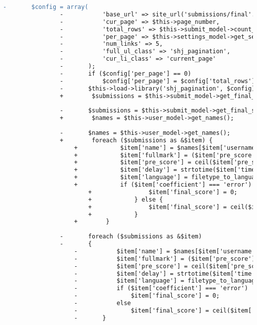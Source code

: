 \begin{lstlisting}[language=diff, caption=Perubahan pada kode Submissions.php]
				-		$config = array(
				-			'base_url' => site_url('submissions/final'.($this->filter_user?'/user/'.$this->filter_user:'').($this->filter_problem?'/problem/'.$this->filter_problem:'')),
				-			'cur_page' => $this->page_number,
				-			'total_rows' => $this->submit_model->count_final_submissions($this->user->selected_assignment['id'], $this->user->level, $this->user->username, $this->filter_user, $this->filter_problem),
				-			'per_page' => $this->settings_model->get_setting('results_per_page_final'),
				-			'num_links' => 5,
				-			'full_ul_class' => 'shj_pagination',
				-			'cur_li_class' => 'current_page'
				-		);
				-		if ($config['per_page'] == 0)
				-			$config['per_page'] = $config['total_rows'];
				-		$this->load->library('shj_pagination', $config);
				+        $submissions = $this->submit_model->get_final_submissions($this->user->selected_assignment['id'], $this->user->level, $this->user->username, $this->page_number, $this->filter_user, $this->filter_problem);
				
				-		$submissions = $this->submit_model->get_final_submissions($this->user->selected_assignment['id'], $this->user->level, $this->user->username, $this->page_number, $this->filter_user, $this->filter_problem);
				+        $names = $this->user_model->get_names();
				
				-		$names = $this->user_model->get_names();
				+        foreach ($submissions as &$item) {
					+            $item['name'] = $names[$item['username']];
					+            $item['fullmark'] = ($item['pre_score'] == 10000);
					+            $item['pre_score'] = ceil($item['pre_score'] * $this->problems[$item['problem']]['score'] / 10000);
					+            $item['delay'] = strtotime($item['time']) - strtotime($this->user->selected_assignment['finish_time']);
					+            $item['language'] = filetype_to_language($item['file_type']);
					+            if ($item['coefficient'] === 'error') {
						+                $item['final_score'] = 0;
						+            } else {
						+                $item['final_score'] = ceil($item['pre_score'] * $item['coefficient'] / 100);
						+            }
					+        }
				
				-		foreach ($submissions as &$item)
				-		{
					-			$item['name'] = $names[$item['username']];
					-			$item['fullmark'] = ($item['pre_score'] == 10000);
					-			$item['pre_score'] = ceil($item['pre_score']*$this->problems[$item['problem']]['score']/10000);
					-			$item['delay'] = strtotime($item['time'])-strtotime($this->user->selected_assignment['finish_time']);
					-			$item['language'] = filetype_to_language($item['file_type']);
					-			if ($item['coefficient'] === 'error')
					-				$item['final_score'] = 0;
					-			else
					-				$item['final_score'] = ceil($item['pre_score']*$item['coefficient']/100);
					-		}
				

\end{lstlisting}
